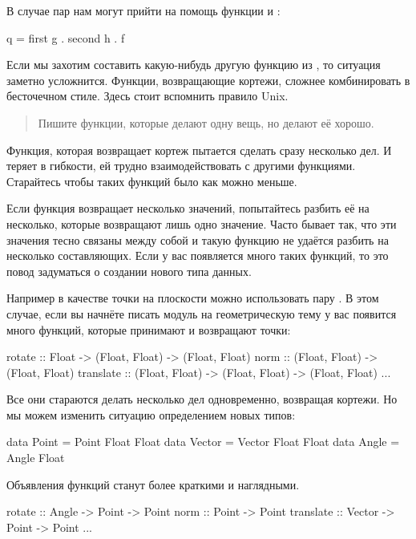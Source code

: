 В случае пар нам могут прийти на помощь функции 
и :

\begin{code}
q = first g . second h . f
\end{code}

Если мы захотим составить какую-нибудь другую 
функцию из , то ситуация заметно усложнится. 
Функции, возвращающие кортежи, сложнее 
комбинировать в бесточечном стиле.
Здесь стоит вспомнить правило Unix. 

\begin{quote}
Пишите функции, которые делают одну вещь, но делают её хорошо. 
\end{quote}

Функция, которая возвращает кортеж пытается
сделать сразу несколько дел. И теряет в гибкости,
ей трудно взаимодействовать с другими функциями. 
Старайтесь чтобы таких функций было как можно меньше. 

Если функция возвращает несколько значений, попытайтесь
разбить её на несколько, которые возвращают лишь одно
значение. Часто бывает так, что эти значения тесно связаны
между собой и такую функцию не удаётся разбить на 
несколько составляющих. Если у вас появляется много 
таких функций, то это повод задуматься о создании нового
типа данных. 

Например в качестве точки на плоскости можно использовать
пару . В этом случае, если вы начнёте 
писать модуль на геометрическую тему у вас появится много функций,
которые принимают и возвращают точки:

\begin{code}
rotate      :: Float -> (Float, Float) -> (Float, Float)
norm        :: (Float, Float) -> (Float, Float)
translate   :: (Float, Float) -> (Float, Float) -> (Float, Float)
...    
\end{code}

Все они стараются делать несколько дел одновременно,
возвращая кортежи. Но мы можем изменить ситуацию 
определением новых типов:

\begin{code}
data Point  = Point  Float Float
data Vector = Vector Float Float
data Angle  = Angle  Float
\end{code}

Объявления функций станут более краткими и наглядными.

\begin{code}
rotate      :: Angle  -> Point -> Point
norm        :: Point  -> Point
translate   :: Vector -> Point -> Point
...    
\end{code}


